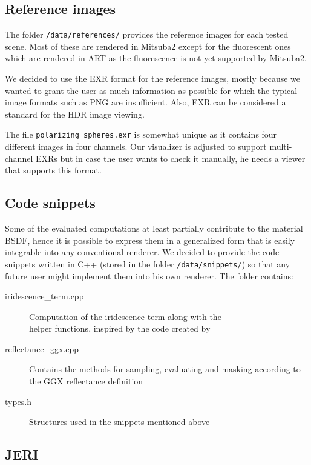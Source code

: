 \subsection{Reference images}

The folder \texttt{/data/references/} provides the reference images for each tested scene. Most of these are rendered in Mitsuba2 except for the fluorescent ones which are rendered in ART as the fluorescence is not yet supported by Mitsuba2.

We decided to use the EXR format for the reference images, mostly because we wanted to grant the user as much information as possible for which the typical image formats such as PNG are insufficient. Also, EXR can be considered a standard for the HDR image viewing.

The file \texttt{polarizing\_spheres.exr} is somewhat unique as it contains four different images in four channels. Our visualizer is adjusted to support multi-channel EXRs but in case the user wants to check it manually, he needs a viewer that supports this format.

\subsection{Code snippets}

Some of the evaluated computations at least partially contribute to the material BSDF, hence it is possible to express them in a generalized form that is easily integrable into any conventional renderer. We decided to provide the code snippets written in C++ (stored in the folder \texttt{/data/snippets/}) so that any future user might implement them into his own renderer. The folder contains:

\begin{description}
	\item[iridescence\_term.cpp] Computation of the iridescence term along with the \\helper functions, inspired by the code created by \citet{belcour2017practical}
	\item[reflectance\_ggx.cpp] Contains the methods for sampling, evaluating and masking according to the GGX reflectance definition~\cite{walter2007microfacet}
	\item[types.h] Structures used in the snippets mentioned above 
\end{description}

\subsection{JERI}
\label{sec:jeri}

